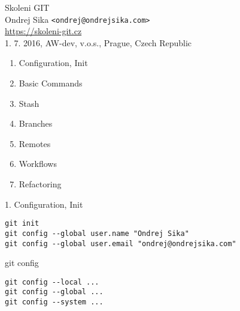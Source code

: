 \documentclass{beamer}
\begin{document}
\begin{frame}

    {\LARGE Skoleni GIT}\\
    \vspace{7mm}
    {\Large Ondrej Sika \lstinline|<ondrej@ondrejsika.com>|}\\
    \vspace{7mm}
    {\large \url{https://skoleni-git.cz}}\\
    \vspace{7mm}
    1. 7. 2016, AW-dev, v.o.s., Prague, Czech Republic\\

\end{frame}

\begin{frame}[fragile]

    \begin{enumerate}
        \item Configuration, Init
        \item Basic Commands
        \item Stash
        \item Branches
        \item Remotes
        \item Workflows
        \item Refactoring
    \end{enumerate}

\end{frame}


\begin{frame}[fragile]

    {\LARGE 1. Configuration, Init}\\

    \begin{verbatim}
git init
git config --global user.name "Ondrej Sika"
git config --global user.email "ondrej@ondrejsika.com"
    \end{verbatim}

\end{frame}


\begin{frame}[fragile]

    {\LARGE git config}\\

    \begin{verbatim}
git config --local ...
git config --global ...
git config --system ...
    \end{verbatim}

\end{frame}
\end{document}
